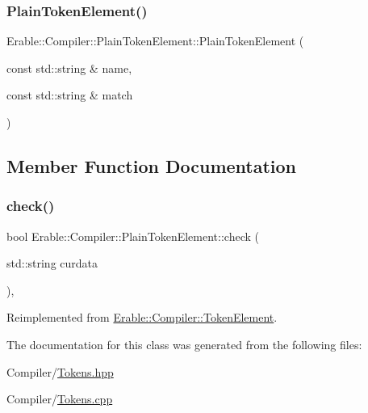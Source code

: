 \subsubsection{\texorpdfstring{PlainTokenElement()}{PlainTokenElement()}}
{\footnotesize\ttfamily Erable\+::\+Compiler\+::\+Plain\+Token\+Element\+::\+Plain\+Token\+Element (\begin{DoxyParamCaption}\item[{const std\+::string \&}]{name,  }\item[{const std\+::string \&}]{match }\end{DoxyParamCaption})}



\subsection{Member Function Documentation}
\mbox{\label{class_erable_1_1_compiler_1_1_plain_token_element_a84f12d7d773c70712b30827eae60caed}} 
\subsubsection{\texorpdfstring{check()}{check()}}
{\footnotesize\ttfamily bool Erable\+::\+Compiler\+::\+Plain\+Token\+Element\+::check (\begin{DoxyParamCaption}\item[{std\+::string}]{curdata }\end{DoxyParamCaption})\hspace{0.3cm}{\ttfamily [override]}, {\ttfamily [virtual]}}



Reimplemented from \mbox{\hyperlink{class_erable_1_1_compiler_1_1_token_element_a939f70ed141904d769b6d9f6ecf39cb1}{Erable\+::\+Compiler\+::\+Token\+Element}}.



The documentation for this class was generated from the following files\+:\begin{DoxyCompactItemize}
\item 
Compiler/\mbox{\hyperlink{_tokens_8hpp}{Tokens.\+hpp}}\item 
Compiler/\mbox{\hyperlink{_tokens_8cpp}{Tokens.\+cpp}}\end{DoxyCompactItemize}

